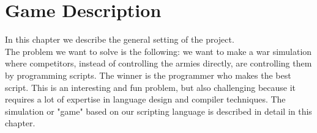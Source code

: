 \chapter{Game Description}
In this chapter we describe the general setting of the project. \\
The problem we want to solve is the following: we want to make a war simulation where competitors, 
instead of controlling the armies directly, are controlling them by programming scripts. The winner is the programmer who makes the best script. 
This is an interesting and fun problem, but also challenging because it requires a lot of expertise in language design and compiler techniques.
The simulation or "game" based on our scripting language is described in detail in this chapter.